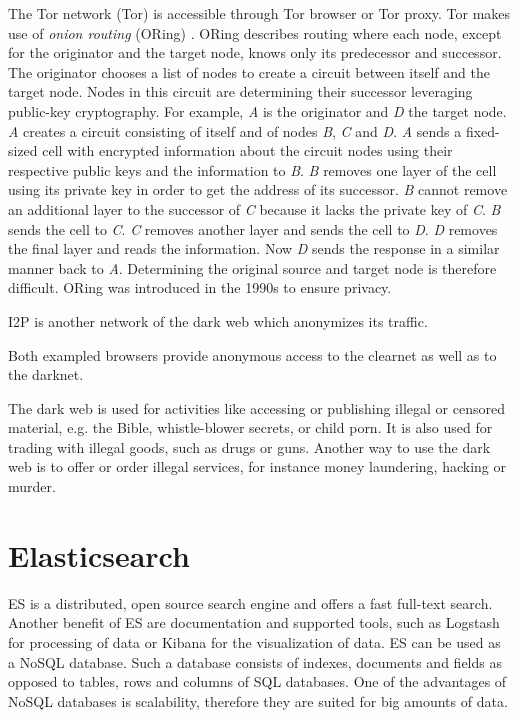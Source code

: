 The Tor network (Tor) is accessible through Tor browser or Tor proxy. Tor makes use of \textit{onion routing} (ORing) \cite{onionRouting}. ORing describes routing where each node, except for the originator and the target node, knows only its predecessor and successor. The originator chooses a list of nodes to create a circuit between itself and the target node. Nodes in this circuit are determining their successor leveraging public-key cryptography. For example, \textit{A} is the originator and \textit{D} the target node. \textit{A} creates a circuit consisting of itself and of nodes \textit{B}, \textit{C} and \textit{D}. \textit{A} sends a fixed-sized cell with encrypted information about the circuit nodes using their respective public keys and the information to \textit{B}. \textit{B} removes one layer of the cell using its private key in order to get the address of its successor. \textit{B} cannot remove an additional layer to the successor of \textit{C} because it lacks the private key of \textit{C}. \textit{B} sends the cell to \textit{C}. \textit{C} removes another layer and sends the cell to \textit{D}. \textit{D} removes the final layer and reads the information. Now \textit{D} sends the response in a similar manner back to \textit{A}. Determining the original source and target node is therefore difficult. ORing was introduced in the 1990s to ensure privacy. 

I2P is another network of the dark web which anonymizes its traffic. 

Both exampled browsers provide anonymous access to the clearnet as well as to the darknet. 

The dark web is used for activities like accessing or publishing illegal or censored material, e.g. the Bible, whistle-blower secrets, or child porn. It is also used for trading with illegal goods, such as drugs or guns. Another way to use the dark web is to offer or order illegal services, for instance money laundering, hacking or murder.

\section{Elasticsearch}  \label{Elasticsearch}
ES is a distributed, open source search engine \cite{elasticSearch} and offers a fast full-text search. Another benefit of ES are documentation and supported tools, such as Logstash \cite{logstash} for processing of data or Kibana \cite{kibana} for the visualization of data. ES can be used as a NoSQL database. Such a database consists of indexes, documents and fields as opposed to tables, rows and columns of SQL databases.  One of the advantages of NoSQL databases is scalability, therefore they are suited for big amounts of data. 

